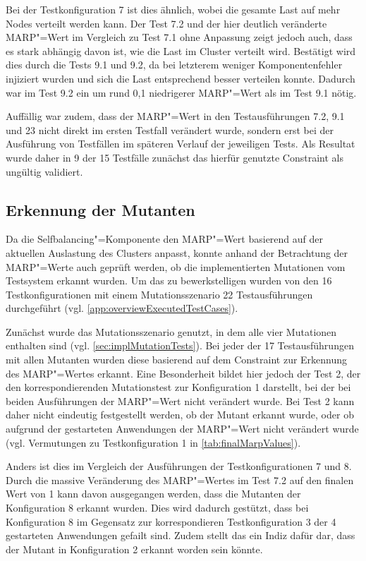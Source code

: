 Bei der Testkonfiguration 7 ist dies ähnlich, wobei die gesamte Last auf mehr Nodes verteilt werden kann.
Der Test 7.2 und der hier deutlich veränderte \ac{MARP}"=Wert im Vergleich zu Test 7.1 ohne Anpassung zeigt jedoch auch, dass es stark abhängig davon ist, wie die Last im Cluster verteilt wird.
Bestätigt wird dies durch die Tests 9.1 und 9.2, da bei letzterem weniger Komponentenfehler injiziert wurden und sich die Last entsprechend besser verteilen konnte.
Dadurch war im Test 9.2 ein um rund 0,1 niedrigerer \ac{MARP}"=Wert als im Test 9.1 nötig.

Auffällig war zudem, dass der \ac{MARP}"=Wert in den Testausführungen 7.2, 9.1 und 23 nicht direkt im ersten Testfall verändert wurde, sondern erst bei der Ausführung von Testfällen im späteren Verlauf der jeweiligen Tests.
Als Resultat wurde daher in 9 der 15 Testfälle zunächst das hierfür genutzte Constraint als ungültig validiert.

\subsection{Erkennung der Mutanten}
\label{sec:killingMutants}

Da die Selfbalancing"=Komponente den \ac{MARP}"=Wert basierend auf der aktuellen Auslastung des Clusters anpasst, konnte anhand der Betrachtung der \ac{MARP}"=Werte auch geprüft werden, ob die implementierten Mutationen vom Testsystem erkannt wurden.
Um das zu bewerkstelligen wurden von den 16 Testkonfigurationen mit einem Mutationsszenario 22 Testausführungen durchgeführt (vgl. \autoref{app:overviewExecutedTestCases}).

Zunächst wurde das Mutationsszenario genutzt, in dem alle vier Mutationen enthalten sind (vgl. \autoref{sec:implMutationTests}).
Bei jeder der 17 Testausführungen mit allen Mutanten wurden diese basierend auf dem Constraint zur Erkennung des \ac{MARP}"=Wertes erkannt.
Eine Besonderheit bildet hier jedoch der Test 2, der den korrespondierenden Mutationstest zur Konfiguration 1 darstellt, bei der bei beiden Ausführungen der \ac{MARP}"=Wert nicht verändert wurde.
Bei Test 2 kann daher nicht eindeutig festgestellt werden, ob der Mutant erkannt wurde, oder ob aufgrund der gestarteten Anwendungen der \ac{MARP}"=Wert nicht verändert wurde (vgl. Vermutungen zu Testkonfiguration 1 in \autoref{tab:finalMarpValues}).

Anders ist dies im Vergleich der Ausführungen der Testkonfigurationen 7 und 8.
Durch die massive Veränderung des \ac{MARP}"=Wertes im Test 7.2 auf den finalen Wert von 1 kann davon ausgegangen werden, dass die Mutanten der Konfiguration 8 erkannt wurden.
Dies wird dadurch gestützt, dass bei Konfiguration 8 im Gegensatz zur korrespondieren Testkonfiguration 3 der 4 gestarteten Anwendungen gefailt sind.
Zudem stellt das ein Indiz dafür dar, dass der Mutant in Konfiguration 2 erkannt worden sein könnte.

